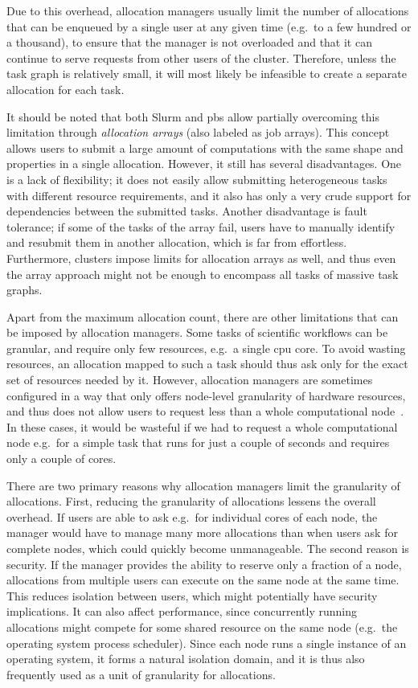 Due to this overhead, allocation managers usually limit the number of allocations that can be
enqueued by a single user at any given time (e.g.\ to a few hundred or a thousand), to ensure that
the manager is not overloaded and that it can continue to serve requests from other users of the
cluster. Therefore, unless the task graph is relatively small, it will most likely be infeasible to
create a separate allocation for each task.

It should be noted that both Slurm and \gls{pbs} allow partially overcoming this
limitation through \emph{allocation arrays} (also labeled as job arrays). This concept allows users to submit a large amount of
computations with the same shape and properties in a single allocation. However, it still has
several disadvantages. One is a lack of flexibility; it does not easily allow submitting
heterogeneous tasks with different resource requirements, and it also has only a very crude support
for dependencies between the submitted tasks. Another disadvantage is fault tolerance; if some of
the tasks of the array fail, users have to manually identify and resubmit them in another
allocation, which is far from effortless. Furthermore, clusters impose limits for allocation arrays
as well, and thus even the array approach might not be enough to encompass all tasks of massive
task graphs.

Apart from the maximum allocation count, there are other limitations that can be imposed by
allocation managers. Some tasks of scientific workflows can be granular, and require only few
resources, e.g.\ a single \gls{cpu} core. To avoid wasting resources, an allocation
mapped to such a task should thus ask only for the exact set of resources needed by it. However,
allocation managers are sometimes configured in a way that only offers node-level granularity of
hardware resources, and thus does not allow users to request less than a whole computational
node~\cite{it4i_node_scheduling_policy}. In these cases, it would be wasteful if we had to request a whole
computational node e.g.\ for a simple task that runs for just a couple of seconds and requires only
a couple of cores.

There are two primary reasons why allocation managers limit the granularity of allocations. First,
reducing the granularity of allocations lessens the overall overhead. If users are able to ask
e.g.\ for individual cores of each node, the manager would have to manage many more allocations
than when users ask for complete nodes, which could quickly become unmanageable. The second reason
is security. If the manager provides the ability to reserve only a fraction of a node, allocations
from multiple users can execute on the same node at the same time. This reduces isolation between
users, which might potentially have security implications. It can also affect performance, since
concurrently running allocations might compete for some shared resource on the same node (e.g.\ the
operating system process scheduler). Since each node runs a single instance of an operating system,
it forms a natural isolation domain, and it is thus also frequently used as a unit of granularity
for allocations.

